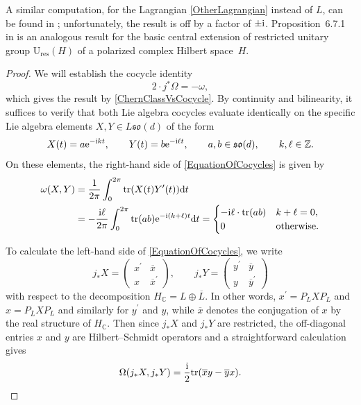 \documentclass[11pt]{article}
\numberwithin{equation}{section}
\numberwithin{equation}{section}
\newcommand{\Z}{\mathbb{Z}}
\newcommand{\C}{\mathbb{C}}
\newcommand{\tr}{\mathrm{tr}}
\newcommand{\res}{\mathrm{res}}
\newcommand{\U}{\mathrm{U}}
\begin{document}
A similar computation, for the Lagrangian \eqref{OtherLagrangian} instead of $L$, can be found in \cite{KristelWaldorf1}; unfortunately, the result is off by a factor of $\pm {\rm i}$.
Proposition~6.7.1 in \cite{PressleySegal} is an analogous result for the basic central extension of restricted unitary group $\U_{\res}(H)$ of a polarized complex Hilbert space~$H$.

\begin{proof}We will establish the cocycle identity
\begin{equation}\label{EquationOfCocycles}
 2 \cdot j^*\Omega = -\omega,	
\end{equation}
which gives the result by \eqref{ChernClassVsCocycle}.
By continuity and bilinearity, it suffices to verify that both Lie algebra cocycles evaluate identically on the specific Lie algebra elements $X,Y \in L\mathfrak{so}(d)$ of the form
\begin{equation*}
	X(t) = a {\rm e}^{-{\rm i}kt}, \qquad Y(t) = b {\rm e}^{-{\rm i}\ell t}, \qquad a, b \in \mathfrak{so}(d), \qquad k, \ell \in \Z.
\end{equation*}
On these elements, the right-hand side of \eqref{EquationOfCocycles} is given by
\begin{align}
 \omega(X, Y) &= \frac{1}{2\pi}\int_0^{2\pi} \tr(X(t) Y^\prime(t)) {\rm d}t
 \nonumber\\
 &= -\frac{{\rm i}\ell}{2\pi}\int_0^{2\pi} \tr(ab) {\rm e}^{-{\rm i}(k+\ell)t} {\rm d}t
 = \begin{cases} -{\rm i}\ell \cdot \tr(ab) & k+\ell = 0, \\ 0 & \text{otherwise}.
 \end{cases}\label{ToCompareWithOmega}
\end{align}

To calculate the left-hand side of \eqref{EquationOfCocycles}, we write
	\begin{equation*}
 j_*X =
 \begin{pmatrix}
 	x^\prime & \overline{x} \\ x & \overline{x}^\prime
 \end{pmatrix},	
 \qquad
 j_*Y =
 \begin{pmatrix}
 	y^\prime & \overline{y} \\ y & \overline{y}^\prime
 \end{pmatrix}	
\end{equation*}
with respect to the decomposition $H_\C = L \oplus \overline{L}$.
In other words, $x^\prime = P_LXP_L$ and $x = P_{\overline{L}}XP_L$ and similarly for $y^\prime$ and $y$, while $\overline{x}$ denotes the conjugation of $x$ by the real structure of $H_\C$.
Then since $j_*X$ and $j_*Y$ are restricted, the off-diagonal entries $x$ and $y$ are Hilbert--Schmidt operators and a straightforward calculation gives
\begin{equation}
\label{ReformulatedOmega}
 \Omega(j_*X, j_*Y) = \frac{{\rm i}}{2} \tr(\overline{x} y - \overline{y}x).	
\end{equation}


\end{proof}
\end{document}
